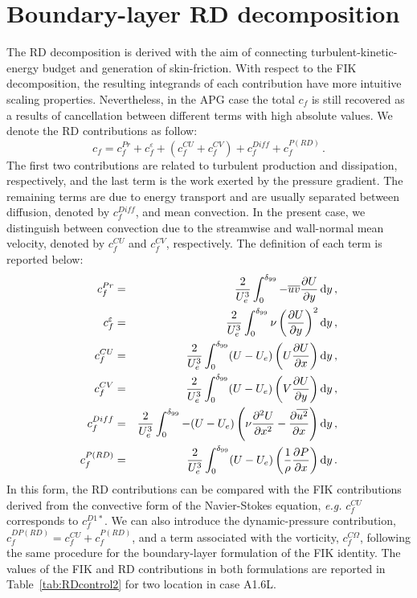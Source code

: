 \appendix

\section{Boundary-layer RD decomposition}
\label{sec:appendix1}
The RD decomposition is derived with the aim of connecting turbulent-kinetic-energy budget and generation of skin-friction\cite{rena16}. With respect to the FIK decomposition, the resulting integrands of each contribution have more intuitive scaling properties. Nevertheless, in the APG case the total $c_f$ is still recovered as a results of cancellation between different terms with high absolute values. We denote the RD contributions as follow:
\begin{equation}
    c_f = c^{Pr}_f + c^\varepsilon_f + ( c^{CU}_f + c^{CV}_f ) + c^{Diff}_f + c^{P(RD)}_f\,.
\end{equation}
The first two contributions are related to turbulent production and dissipation, respectively, and the last term is the work exerted by the pressure gradient. The remaining terms are due to energy transport and are usually separated between diffusion, denoted by $c^{Diff}_f$, and mean convection. In the present case, we distinguish between convection due to the streamwise and wall-normal mean velocity, denoted by $c^{CU}_f$ and $c^{CV}_f$, respectively. The definition of each term is reported below:
\begin{eqnarray}
    c^{Pr}_f & = & \frac{2}{U_e^3} \int_0^{\delta_{99}} -\overline{uv} \frac{\partial U}{\partial y}  \, {\rm d} y\,,\\
    c^{\varepsilon}_f & = &\frac{2}{U_e^3} \int_0^{\delta_{99}} \nu \left ( \frac{\partial U}{\partial y} \right )^2   {\rm d} y\,,\\
    c^{CU}_f & = & \frac{2}{U_e^3} \int_0^{\delta_{99}}  (U - U_e) \left ( U \frac{\partial U}{\partial x} \right ) {\rm d}y \,,\\
    c^{CV}_f & = & \frac{2}{U_e^3} \int_0^{\delta_{99}}  (U - U_e) \left ( V \frac{\partial U}{\partial y} \right ) {\rm d}y  \,,\\
    c^{Diff}_f & = & \frac{2}{U_e^3} \int_0^{\delta_{99}} - (U - U_e) \left ( \nu \frac{\partial^2 U}{\partial x^2} - \frac{\partial \overline{u^2}}{\partial x} \right ) {\rm d} y\,,\\
    c^{P(RD)}_f & = &\frac{2}{U_e^3} \int_0^{\delta_{99}}  (U - U_e) \left ( \frac 1 \rho \frac{\partial P}{\partial x} \right ) {\rm d} y \,.
\end{eqnarray}
In this form, the RD contributions can be compared with the FIK contributions derived from the convective form of the Navier-Stokes equation, \textit{e.g.\!} $c^{CU}_f$ corresponds to $c^{D1*}_f$. We can also introduce the dynamic-pressure contribution, $c^{DP(RD)}_f=c^{CU}_f+c^{P(RD)}_f$, and a term associated with the vorticity, $c^{C\Omega}_f$, following the same procedure for the boundary-layer formulation of the FIK identity. The values of the FIK and RD contributions in both formulations are reported in Table~\ref{tab:RDcontrol2} for two location in case A1.6L. 

